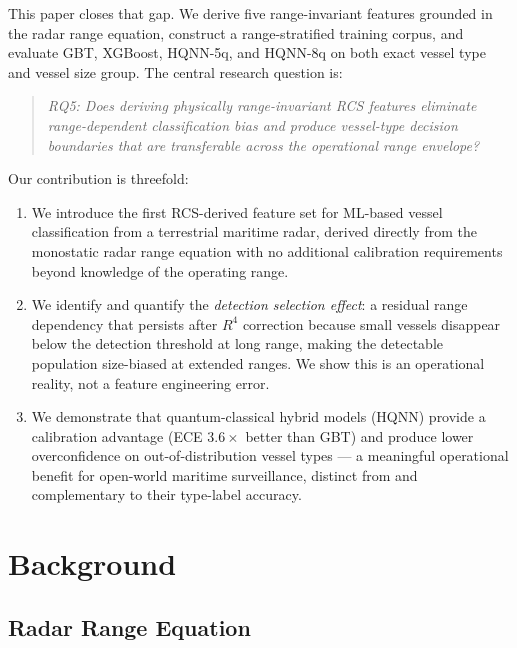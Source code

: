 \documentclass[journal]{IEEEtran}
\begin{document}
This paper closes that gap. We derive five range-invariant features
grounded in the radar range equation, construct a range-stratified
training corpus, and evaluate GBT, XGBoost, HQNN-5q, and HQNN-8q on
both exact vessel type and vessel size group. The central research
question is:

\begin{quote}
\textit{RQ5: Does deriving physically range-invariant RCS features
eliminate range-dependent classification bias and produce vessel-type
decision boundaries that are transferable across the operational range
envelope?}
\end{quote}

Our contribution is threefold:
\begin{enumerate}
  \item We introduce the first RCS-derived feature set for ML-based
        vessel classification from a terrestrial maritime radar, derived
        directly from the monostatic radar range equation with no
        additional calibration requirements beyond knowledge of the
        operating range.
  \item We identify and quantify the \emph{detection selection effect}:
        a residual range dependency that persists after $R^4$ correction
        because small vessels disappear below the detection threshold at
        long range, making the detectable population size-biased at
        extended ranges. We show this is an operational reality, not a
        feature engineering error.
  \item We demonstrate that quantum-classical hybrid models (HQNN) provide
        a calibration advantage (ECE $3.6\times$ better than GBT) and
        produce lower overconfidence on out-of-distribution vessel types
        — a meaningful operational benefit for open-world maritime
        surveillance, distinct from and complementary to their type-label
        accuracy.
\end{enumerate}

\section{Background}
\label{sec:background}

\subsection{Radar Range Equation}
\end{document}
